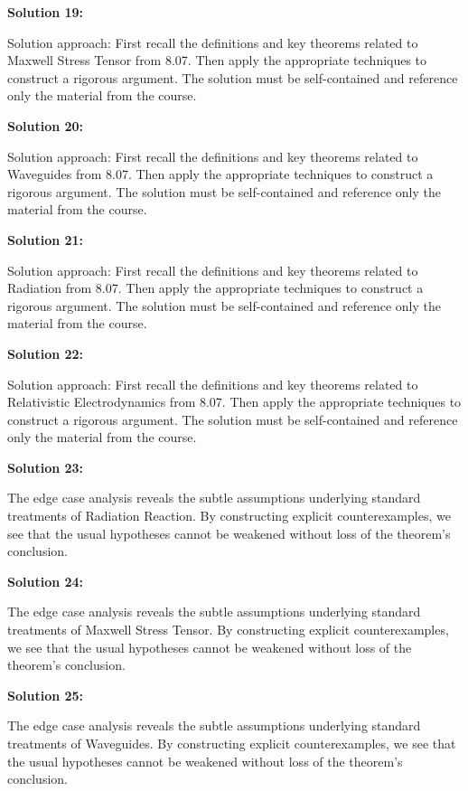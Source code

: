 \documentclass[12pt,a4paper]{exam}
\begin{document}
\vspace{0.5cm}

\textbf{Solution 19:}

Solution approach: First recall the definitions and key theorems related to Maxwell Stress Tensor from 8.07. Then apply the appropriate techniques to construct a rigorous argument. The solution must be self-contained and reference only the material from the course.

\vspace{0.5cm}

\textbf{Solution 20:}

Solution approach: First recall the definitions and key theorems related to Waveguides from 8.07. Then apply the appropriate techniques to construct a rigorous argument. The solution must be self-contained and reference only the material from the course.

\vspace{0.5cm}

\textbf{Solution 21:}

Solution approach: First recall the definitions and key theorems related to Radiation from 8.07. Then apply the appropriate techniques to construct a rigorous argument. The solution must be self-contained and reference only the material from the course.

\vspace{0.5cm}

\textbf{Solution 22:}

Solution approach: First recall the definitions and key theorems related to Relativistic Electrodynamics from 8.07. Then apply the appropriate techniques to construct a rigorous argument. The solution must be self-contained and reference only the material from the course.

\vspace{0.5cm}

\textbf{Solution 23:}

The edge case analysis reveals the subtle assumptions underlying standard treatments of Radiation Reaction. By constructing explicit counterexamples, we see that the usual hypotheses cannot be weakened without loss of the theorem's conclusion.

\vspace{0.5cm}

\textbf{Solution 24:}

The edge case analysis reveals the subtle assumptions underlying standard treatments of Maxwell Stress Tensor. By constructing explicit counterexamples, we see that the usual hypotheses cannot be weakened without loss of the theorem's conclusion.

\vspace{0.5cm}

\textbf{Solution 25:}

The edge case analysis reveals the subtle assumptions underlying standard treatments of Waveguides. By constructing explicit counterexamples, we see that the usual hypotheses cannot be weakened without loss of the theorem's conclusion.

\vspace{0.5cm}
\end{document}
